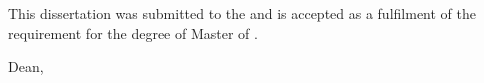 \documentclass[a4paper, oneside]{memoir}
\begin{document}
\ifdefined\myCoSupervisor
  \ifdefined\myExaminer
    \newpage
  \fi
\fi

\noindent This dissertation was submitted to the \myKulliyyah and 
is accepted as a fulfilment of the requirement for the degree of Master of 
\mySubject.\\[24pt]

\hfill \makebox[2in]{\dotfill}

\hfill \myKulliyahDean

\hfill Dean, \myKulliyyah\\[24pt]

\setcounter{page}{\ApprovalPageMastersFolio}
\end{document}
